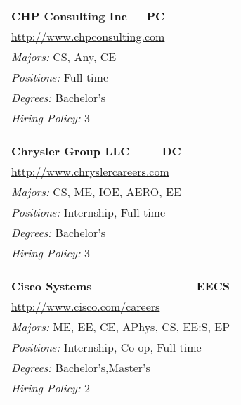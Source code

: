 \documentclass[twoside]{article}
\begin{document}
\begin{center}
\begin{multicols}{3}
\begin{FlushLeft}
\begin{minipage}{.9\columnwidth}
\end{minipage}
 
\begin{minipage}{.9\columnwidth}\begin{tabularx}{.95\columnwidth}{Xr}
                 {\Large\bf CHP Consulting Inc} & {\Large\bf PC}\\
    \multicolumn{2}{p{.95\columnwidth}}{\url{http://www.chpconsulting.com}}\\
    \multicolumn{2}{p{.95\columnwidth}}{\emph{Majors:} CS, Any, CE}\\
    \multicolumn{2}{p{.95\columnwidth}}{\emph{Positions:} Full-time}\\
    \multicolumn{2}{p{.95\columnwidth}}{\emph{Degrees:} Bachelor's}\\
    \multicolumn{2}{p{.95\columnwidth}}{\emph{Hiring Policy:} 3}\\
    \end{tabularx}
    
\end{minipage}
 
\begin{minipage}{.9\columnwidth}\begin{tabularx}{.95\columnwidth}{Xr}
                 {\Large\bf Chrysler Group LLC} & {\Large\bf DC}\\
    \multicolumn{2}{p{.95\columnwidth}}{\url{http://www.chryslercareers.com}}\\
    \multicolumn{2}{p{.95\columnwidth}}{\emph{Majors:} CS, ME, IOE, AERO, EE}\\
    \multicolumn{2}{p{.95\columnwidth}}{\emph{Positions:} Internship, Full-time}\\
    \multicolumn{2}{p{.95\columnwidth}}{\emph{Degrees:} Bachelor's}\\
    \multicolumn{2}{p{.95\columnwidth}}{\emph{Hiring Policy:} 3}\\
    \end{tabularx}
    
\end{minipage}
 
\begin{minipage}{.9\columnwidth}\begin{tabularx}{.95\columnwidth}{Xr}
                 {\Large\bf Cisco Systems} & {\Large\bf EECS}\\
    \multicolumn{2}{p{.95\columnwidth}}{\url{http://www.cisco.com/careers}}\\
    \multicolumn{2}{p{.95\columnwidth}}{\emph{Majors:} ME, EE, CE, APhys, CS, EE:S, EP}\\
    \multicolumn{2}{p{.95\columnwidth}}{\emph{Positions:} Internship, Co-op, Full-time}\\
    \multicolumn{2}{p{.95\columnwidth}}{\emph{Degrees:} Bachelor's,Master's}\\
    \multicolumn{2}{p{.95\columnwidth}}{\emph{Hiring Policy:} 2}\\
    \end{tabularx}
    

\end{minipage}
\end{FlushLeft}
\end{multicols}
\end{center}
\end{document}
